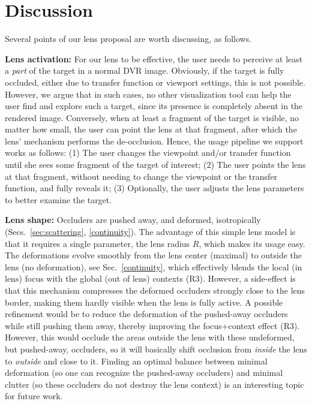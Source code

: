 \section{Discussion}
\label{sec:discussion}
%
%
Several points of our lens proposal are worth discussing, as follows.

\vspace{0.15cm}
\noindent\textbf{Lens activation:} For our lens to be effective, the user needs to perceive at least a \emph{part} of the target in a normal DVR image. Obviously, if the target is fully occluded, either due to transfer function or viewport settings, this is not possible. However, we argue that in such cases, no other visualization tool can help the user find and explore such a target, since its presence is completely absent in the rendered image. Conversely, when at least a fragment of the target is visible, no matter how small, the user can point the lens at that fragment, after which the lens' mechanism performs the de-occlusion. Hence, the usage pipeline we support works as follows: (1) The user changes the viewpoint and/or transfer function until she sees some fragment of the target of interest; (2) The user points the lens at that fragment, without needing to change the viewpoint or the transfer function, and fully reveals it; (3) Optionally, the user adjusts the lens parameters to better examine the target.


\vspace{0.15cm}
\noindent\textbf{Lens shape:} Occluders are pushed away, and deformed, isotropically (Secs.~\ref{sec:scattering}, \ref{continuity}). The advantage of this simple lens model is that it requires a single parameter, the lens radius $R$, which makes its usage easy. The deformations evolve smoothly from the lens center (maximal) to outside the lens (no deformation), see Sec.~\ref{continuity}, which effectively blends the local (in lens) focus with the global (out of lens) contexts (R3). However, a side-effect is that this mechanism compresses the deformed occluders strongly close to the lens border, making them hardly visible when the lens is fully active. A possible refinement would be to reduce the deformation of the pushed-away occluders while still pushing them away, thereby improving the focus+context effect (R3). However, this would occlude the areas outside the lens with these undeformed, but pushed-away, occluders, so it will basically shift occlusion from \emph{inside} the lens to \emph{outside} and close to it. Finding an optimal balance between minimal deformation (so one can recognize the pushed-away occluders) and minimal clutter (so these occluders do not destroy the lens context) is an interesting topic for future work.

